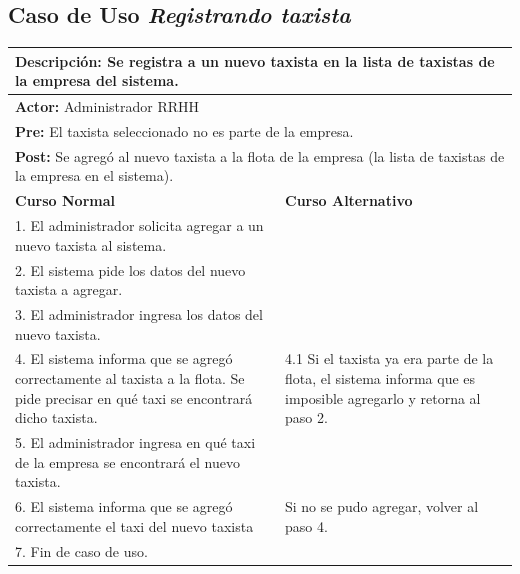 \documentclass[a4paper]{article}
\begin{document}
\subsection{Caso de Uso \textit{Registrando taxista}}	
\begin{center}
\begin{tabular}{|p{10cm} | p{6cm}|}
\hline
\multicolumn{2}{|p{15cm}|}{\textbf{Descripci\'on:} Se registra a un nuevo taxista en la lista de taxistas de la empresa del sistema.} \\
\hline
\multicolumn{2}{|l|}{\textbf{Actor:} Administrador RRHH } \\
\hline
\multicolumn{2}{|p{15cm}|}{\textbf{Pre:} El taxista seleccionado no es parte de la empresa. } \\
\hline
\multicolumn{2}{|p{15cm}|}{\textbf{Post:} Se agreg\'o al nuevo taxista a la flota de la empresa (la lista de taxistas de la empresa en el sistema). }\\
\hline
\textbf{Curso Normal}  & \textbf{Curso Alternativo} \\ \hline
1. El administrador solicita agregar a un nuevo taxista al sistema. & \\ \hline
2. El sistema pide los datos del nuevo taxista a agregar. & \\ \hline
3. El administrador ingresa los datos del nuevo taxista. & \\ \hline
4. El sistema informa que se agreg\'o correctamente al taxista a la flota. Se pide precisar en qu\'e taxi se encontrar\'a dicho taxista. & 4.1 Si el taxista ya era parte de la flota, el sistema informa que es imposible agregarlo y retorna al paso 2. \\ \hline
5. El administrador ingresa en qu\'e taxi de la empresa se encontrar\'a el nuevo taxista. & \\ \hline
6. El sistema informa que se agreg\'o correctamente el taxi del nuevo taxista & Si no se pudo agregar, volver al paso 4. \\ \hline
7. Fin de caso de uso. & \\ \hline

\end{tabular}
\end{center}
\end{document}

